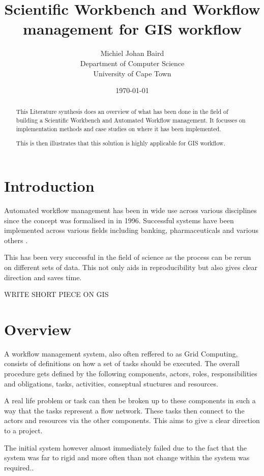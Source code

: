 \documentclass[11pt,twocolumn]{article}
\title{Scientific Workbench and Workflow management for GIS workflow}
\author{
    Michiel Johan Baird \\
        Department of Computer Science \\
        University of Cape Town
}
\date{\today}
\begin{document}
\maketitle
\begin{abstract}
    This Literature synthesis does an overview of what has been done
    in the field of building a Scientific Workbench and Automated
    Workflow management. It focusses on implementation methods and
    case studies on where it has been implemented.

    This is then illustrates that this solution is highly applicable
    for GIS workflow.
\end{abstract}
\section{Introduction}
    Automated workflow management has been in wide use across
    various disciplines since the concept was formalised in in
    1996\cite{springerlink:10.1007/BF00136712}. Successful systems
    have been implemented across various fields including banking,
    pharmaceuticals and various others
    \cite{Brahe:2007:SWW:1316624.1316661,5407993}.

    This has been very successful in the field of science as
    the process can be rerun on different sets of data.\cite{4721191}
    This not only aids in reproducibility but also gives
    clear direction and saves time.

    WRITE SHORT PIECE ON GIS

\section{Overview}
    A workflow management system, also often reffered to as
    Grid Computing, consists of definitions on how a set of
    tasks should be executed\cite{springerlink:10.1007/BF00136712,vanderAalst2002125}.
    The overall procedure gets defined by the following
    components, actors, roles, responsibilities and
    obligations, tasks, activities, conseptual stuctures
    and resources.

    A real life problem or task can then be broken up to these
    components in such a way that the tasks represent a flow
    network. These tasks then connect to the actors and resources
    via the other components\cite[p.~4]{Taylor:2006:WES:1196459}.
    This aims to give a clear direction to a project.

    The initial system however almost immediately failed
    due to the fact that the system was far to rigid and
    more often than not change within the system was
    required.\cite{Suchman:1983:OPP:357442.357445}.
\end{document}
